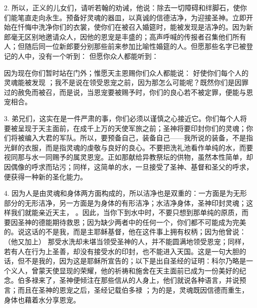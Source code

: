 2. 所以，正义的儿女们，请听若翰的劝诫，他说：除去一切障碍和绊脚石，使你们能笔直走向永生。预备好灵魂的器皿，以真诚的信德洁净，为迎接圣神。立即开始在忏悔中洗净你们的衣裳，使你们在被召入婚筵时，能被发现是洁净的。因为新郎毫无区别地邀请众人，因他的恩宠是丰盛的；高声呼喊的传报者召集他们所有人；但随后同一位新郎要分别那些前来参加比喻性婚筵的人。但愿那些名字已被登记的人中，没有一个听到：  但愿你众人都能听到： \par

因为现在你们暂时站在门外；惟愿天主恩赐你们众人都能说：  好使你们每个人的灵魂能被发现 ；我不是说在领受恩宠之前，因为那怎么可能呢？既然你们是因罪过的赦免而被召，而是说，当恩宠要被赐予时，你们的良心若不被定罪，便能与恩宠相合。\par

3. 弟兄们，这实在是一件严肃的事，你们必须以谨慎之心接近它。你们每个人将要被呈现于天主面前，在成千上万的天使军旅之前；圣神将要印封你们的灵魂；你们将被编入大君的军队。所以，要预备自己，装备自己——我所说的装备，不是指光鲜的衣服，而是指灵魂的虔敬与良好的良心。不要把洗礼池看作单纯的水，而要视同那与水一同赐予的属灵恩宠。正如那献给异教祭坛的供物，虽然本性简单，却因偶像的呼求而玷污；同样，这简单的水，一旦接受了圣神、基督和圣父的呼求，便获得一种新的圣化能力。\par

4. 因为人是由灵魂和身体两方面构成的，所以洁净也是双重的：一方面是为无形部分的无形洁净，另一方面是为身体的有形洁净；水洁净身体，圣神印封灵魂；这样我们就能亲近天主， 。因此，当你下到水中时，不要只想到那单纯的原质，而要因圣神的德能期待救恩；因为缺少两者中的任何一个，你们都不可能成为完美的。说这话的不是我，而是主耶稣基督，他在这件事上拥有权柄；因为他曾说：（他又加上）  那受水洗却未堪当领受圣神的人，并不能圆满地领受恩宠；同样，若有人在行为上圣善，却没有接受水的印封，也不能进入天国。这是一句大胆的话，但不是我的，因为这是耶稣所宣告的；以下是出自圣经的证明：科尔乃略是一个义人，曾蒙天使显现的荣耀，他的祈祷和施舍在天主面前已成为一份美好的纪念。伯多禄来了，圣神便倾注在那些信从的人身上，他们就说各种语言，并说预言；而且在圣神的恩宠之后，圣经记载伯多禄 ；为的是，灵魂既因信德而重生，身体也藉着水分享恩宠。\par


